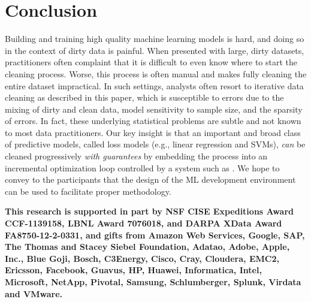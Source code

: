 \section{Conclusion}

Building and training high quality machine learning models is hard, and doing so in the context of dirty data is painful.
When presented with large, dirty datasets, practitioners often complaint that it is difficult to even know where to start the cleaning process.
Worse, this process is often manual and makes fully cleaning the entire dataset impractical.  
In such settings, analysts often resort to iterative data cleaning  as described in this paper, 
which is susceptible to errors due to the mixing of dirty and clean data, model sensitivity to sample size, and the sparsity of errors.
In fact, these underlying statistical problems are subtle and not known to most data practitioners.
Our key insight is that an important and broad class of predictive models, called loss models (e.g., linear regression and SVMs), 
{\it can} be cleaned progressively {\it with guarantees} by embedding the process into an incremental optimization loop controlled by a system such as \sys.
We hope to convey to the participants that the design of the ML development environment can be used to facilitate proper methodology.

\vspace{1em}

\textbf{\small This research is supported in part by NSF CISE Expeditions Award CCF-1139158, LBNL Award 7076018, and DARPA XData Award FA8750-12-2-0331, and gifts from Amazon Web Services, Google, SAP, The Thomas and Stacey Siebel Foundation, Adatao, Adobe, Apple, Inc., Blue Goji, Bosch, C3Energy, Cisco, Cray, Cloudera, EMC2, Ericsson, Facebook, Guavus, HP, Huawei, Informatica, Intel, Microsoft, NetApp, Pivotal, Samsung, Schlumberger, Splunk, Virdata and VMware.}
